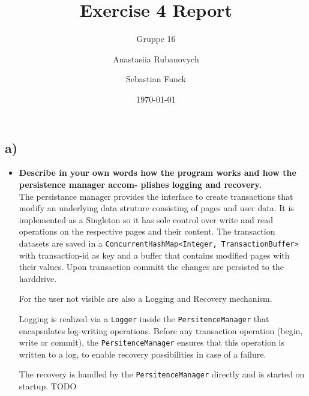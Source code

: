 \documentclass[a4paper,english,abstract=on]{scrartcl}
\title{Exercise 4 Report}
\subtitle{Gruppe 16}
\author{Anastasiia Rubanovych\and Sebastian Funck}
\date{\today}
\begin{document}
\maketitle

\subsection*{a)}
\begin{itemize}
	\item \textbf{Describe in your own words how the program works and how the persistence manager accom-
		plishes logging and recovery.}\\
	
	The persistance manager provides the interface to create transactions that modify an underlying data struture consisting of pages and user data. It is implemented as a Singleton so it has sole control over write and read operations on the respective pages and their content. The transaction datasets are saved in a \texttt{ConcurrentHashMap<Integer, TransactionBuffer>} with transaction-id as key and a buffer that contains modified pages with their values. Upon transaction committ the changes are persisted to the harddrive.
	
	
	 For the user not visible are also a Logging and Recovery mechanism. 
	
	Logging is realized via a \texttt{Logger} inside the \texttt{PersitenceManager} that encapsulates log-writing operations. Before any transaction operation (begin, write or commit), the \texttt{PersitenceManager} ensures that this operation is written to a log, to enable recovery possibilities in case of a failure.
	
	The recovery is handled by the  \texttt{PersitenceManager} directly and is started on startup. TODO
\end{itemize}

\newpage
\end{document}
